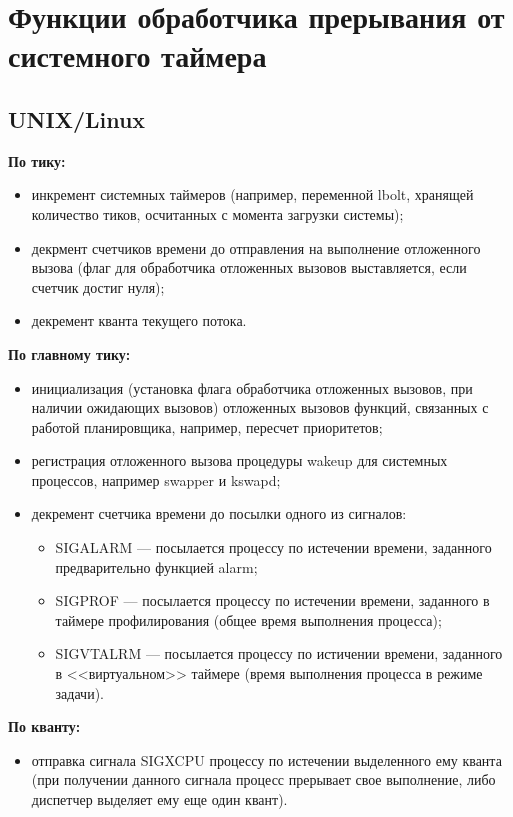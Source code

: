 \chapter{Функции обработчика прерывания от системного таймера}

\section{UNIX/Linux}

\textbf{По тику:}
\begin{itemize}
    \item инкремент системных таймеров (например, переменной lbolt, хранящей количество тиков, осчитанных с момента загрузки системы);
    \item декрмент счетчиков времени до отправления на выполнение отложенного вызова (флаг для обработчика отложенных вызовов выставляется,  если счетчик достиг нуля);
    \item декремент кванта текущего потока.
\end{itemize}

\textbf{По главному тику:}
\begin{itemize}
    \item инициализация (установка флага обработчика отложенных вызовов, при наличии ожидающих вызовов) отложенных вызовов функций, связанных с работой планировщика, например, пересчет приоритетов;
    \item регистрация отложенного вызова процедуры wakeup для системных процессов, например swapper и kswapd;
    \item декремент счетчика времени до посылки одного из сигналов:
    \begin{itemize}
    \item SIGALARM --- посылается процессу по истечении времени, заданного предварительно функцией alarm;
    \item SIGPROF --- посылается процессу по истечении времени, заданного в таймере профилирования (общее время выполнения процесса);
    \item SIGVTALRM --- посылается процессу по истичении времени, заданного в <<виртуальном>> таймере (время выполнения процесса в режиме задачи).
    \end{itemize}
\end{itemize}

\textbf{По кванту:}
\begin{itemize}
    \item отправка сигнала SIGXCPU процессу по истечении выделенного ему кванта (при получении данного сигнала процесс прерывает свое выполнение, либо диспетчер выделяет ему еще один квант).
\end{itemize}


